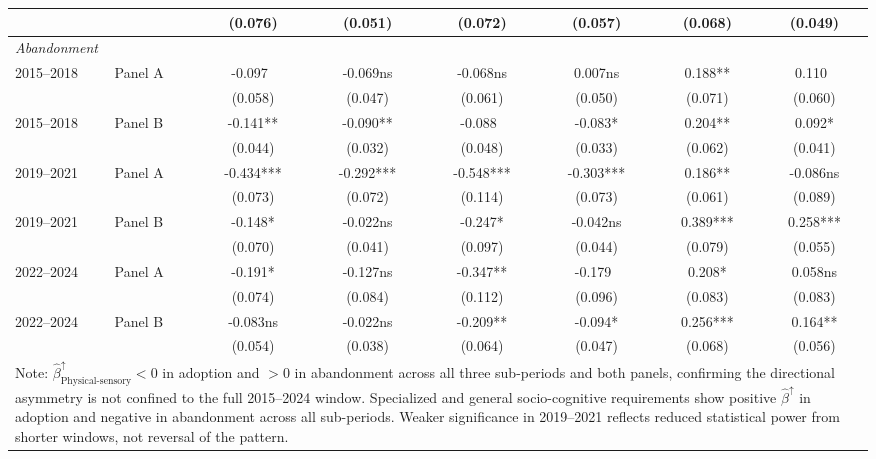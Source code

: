 \begin{table}[ht]
\begin{tabular}{llcccccc}
 & & (0.076) & (0.051) & (0.072) & (0.057) & (0.068) & (0.049) \\
\midrule
\multicolumn{8}{l}{\textit{Abandonment}} \\
\multirow{2}{*}{2015–2018} & Panel A & -0.097~ & -0.069ns & -0.068ns & 0.007ns & 0.188** & 0.110~ \\
 & & (0.058) & (0.047) & (0.061) & (0.050) & (0.071) & (0.060) \\
\multirow{2}{*}{2015–2018} & Panel B & -0.141** & -0.090** & -0.088~ & -0.083* & 0.204** & 0.092* \\
 & & (0.044) & (0.032) & (0.048) & (0.033) & (0.062) & (0.041) \\
\multirow{2}{*}{2019–2021} & Panel A & -0.434*** & -0.292*** & -0.548*** & -0.303*** & 0.186** & -0.086ns \\
 & & (0.073) & (0.072) & (0.114) & (0.073) & (0.061) & (0.089) \\
\multirow{2}{*}{2019–2021} & Panel B & -0.148* & -0.022ns & -0.247* & -0.042ns & 0.389*** & 0.258*** \\
 & & (0.070) & (0.041) & (0.097) & (0.044) & (0.079) & (0.055) \\
\multirow{2}{*}{2022–2024} & Panel A & -0.191* & -0.127ns & -0.347** & -0.179~ & 0.208* & 0.058ns \\
 & & (0.074) & (0.084) & (0.112) & (0.096) & (0.083) & (0.083) \\
\multirow{2}{*}{2022–2024} & Panel B & -0.083ns & -0.022ns & -0.209** & -0.094* & 0.256*** & 0.164** \\
 & & (0.054) & (0.038) & (0.064) & (0.047) & (0.068) & (0.056) \\
\bottomrule
\multicolumn{8}{p{15cm}}{\footnotesize Note:
  $\hat{\beta}^{\uparrow}_{\text{Physical-sensory}} < 0$ in adoption and $> 0$
  in abandonment across all three sub-periods and both panels, confirming
  the directional asymmetry is not confined to the full 2015--2024 window.
  Specialized and general socio-cognitive requirements show positive
  $\hat{\beta}^{\uparrow}$ in adoption and negative in abandonment across
  all sub-periods. Weaker significance in 2019--2021 reflects reduced
  statistical power from shorter windows, not reversal of the pattern.}
\end{tabular}
\end{table}
